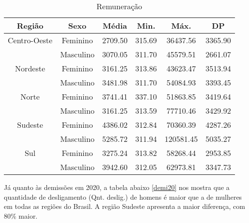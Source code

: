 \begin{table}[htbp]
	\caption{Remuneração}
	\begin{center}
		\begin{tabular}{|c|c|c|c|c|c|}
			\hline
			\textbf{Região} & \textbf{Sexo} & \textbf{Média} & \textbf{Min.} & \textbf{Máx.} & \textbf{DP} \\ 
			\hline																																							
			Centro-Oeste     & Feminino      & 2709.50         & 315.69        & 36437.56       & 3365.90     \\
			                 & Masculino     & 3070.05         & 311.70        & 45579.51       & 2661.07     \\
			\hline	
			Nordeste         & Feminino      & 3161.25         & 313.86        & 43623.47       & 3513.94     \\
			                 & Masculino     & 3481.98         & 311.70        & 54084.93       & 3393.45     \\
			\hline	
			Norte            & Feminino      & 3741.41         & 337.10        & 51863.85       & 3419.64     \\
			                 & Masculino     & 3161.25         & 313.59        & 77710.46       & 3429.92     \\
			\hline	
			Sudeste          & Feminino      & 4386.02         & 312.84        & 70360.39       & 4287.26     \\
			                 & Masculino     & 5285.72         & 311.94        & 120581.45      & 5035.27     \\
			\hline	
			Sul              & Feminino      & 3275.24         & 313.82        & 58268.44       & 2953.85     \\
			                 & Masculino     & 3942.60         & 312.05        & 62973.81       & 3347.73     \\
			\hline
		\end{tabular}
		\label{remun20}
	\end{center}
\end{table}

Já quanto às demissões em 2020, a tabela abaixo \ref{demi20} nos mostra que a quantidade de desligamento (Qnt. deslig.) de homens é maior que a de mulheres em todas as regiões do Brasil. A região Sudeste apresenta a maior diferença, com 80\% maior.

